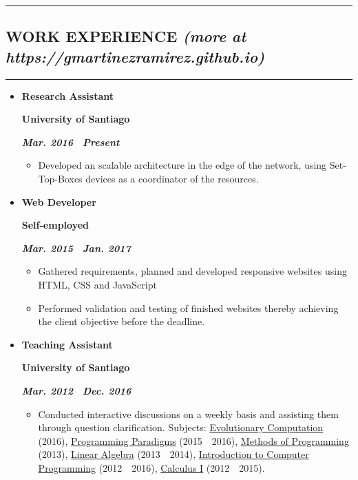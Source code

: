 \documentclass[10pt,letterpaper]{article}
\newcommand{\textbox}[1]{
  \parbox{.333\textwidth}{#1}
}
\newcommand{\sectionTitle}[1]{
  \hrule
  \vspace{-1.0em} 
  \subsection*{\uppercase{\textbf{#1}} }
  \vspace{-0.3em}
    \hrule
    \vspace{0.3em}  
}
\newcommand{\sectionTitleWithWeb}[2]{
  \hrule
  \vspace{-1.0em} 
  \subsection*{\uppercase{\textbf{#1}} \hfill{\small \textit{(more at #2)}}}
  \vspace{-0.3em}
  \hrule
  \vspace{0.3em}  
}
\newcommand{\titleExperienceWithoutLocation}[4]{
  \vspace{1.0em}
  \item[]
  {
    \textbox{\textbf{#1}\hfill}\textbox{\hfil \textbf{#2}\hfil}\hfill \textbf{\emph{#3 \textendash \ #4}}
  }
}
\begin{document}
  \vspace{0.30em} 
  
  \sectionTitleWithWeb{Work Experience}{https://gmartinezramirez.github.io}
  \vspace{-1.1em}
  \begin{itemize}[noitemsep,topsep=0pt]
    \titleExperienceWithoutLocation{Research Assistant}{University of Santiago}{Mar. 2016}{Present}
      \begin{itemize}[label=\textbullet,noitemsep,topsep=0pt]
        \item Developed an scalable architecture in the edge of the network, using Set-Top-Boxes devices as a coordinator of the resources.
      \end{itemize}

    \vspace{-0.6em} 
    \titleExperienceWithoutLocation{Web Developer}{Self-employed}{Mar. 2015}{Jan. 2017}
      \begin{itemize}[label=\textbullet,noitemsep,topsep=0pt]
        \item Gathered requirements, planned and developed responsive websites using HTML, CSS and JavaScript 
        \item Performed validation and testing of finished websites thereby achieving the client objective before the deadline.
      \end{itemize}
    
    \vspace{-0.6em} 
    \titleExperienceWithoutLocation{Teaching Assistant}{University of Santiago}{Mar. 2012}{Dec. 2016}
      \begin{itemize}[label=\textbullet]
        \itemsep0em
        \item Conducted interactive discussions on a weekly basis and assisting them through question clarification. Subjects: \ul{Evolutionary Computation} (2016), \ul{Programming Paradigms} (2015\ \textendash \ 2016), \ul{Methods of Programming} (2013), \ul{Linear Algebra} (2013\ \textendash \ 2014), \ul{Introduction to Computer Programming} (2012\ \textendash \ 2016), \ul{Calculus I} (2012\ \textendash \ 2015).
      \end{itemize}
  \end{itemize}
  \vspace{0.30em} 
\end{document}
